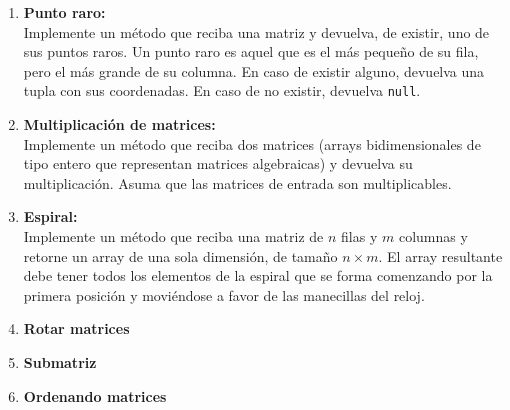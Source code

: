 \begin{enumerate}
    \item \textbf{Punto raro:}\\ 
    Implemente un método que reciba una matriz y devuelva, de existir, uno de sus puntos raros. Un punto raro es aquel que es el más pequeño de su fila, pero el más grande de su columna. En caso de existir alguno, devuelva una tupla con sus coordenadas. En caso de no existir, devuelva \texttt{null}.	

    \item \textbf{Multiplicación de matrices:}\\
    Implemente un método que reciba dos matrices (arrays bidimensionales de tipo entero que representan matrices algebraicas) y devuelva su multiplicación. Asuma que las matrices de entrada son multiplicables.

    \item \textbf{Espiral:}\\
    Implemente un método que reciba una matriz de \(n\) filas y \(m\) columnas y retorne un array de una sola dimensión, de tamaño \(n \times m\). El array resultante debe tener todos los elementos de la espiral que se forma comenzando por la primera posición y moviéndose a favor de las manecillas del reloj.

    \item \textbf{Rotar matrices}\\
    

    \item \textbf{Submatriz}\\
    

    \item \textbf{Ordenando matrices}\\
    
\end{enumerate}

\newpage

